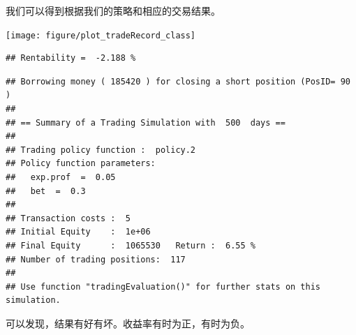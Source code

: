 \documentclass{article}\usepackage[]{graphicx}\usepackage[]{color}
\makeatletter
\newenvironment{kframe}{%
 \def\at@end@of@kframe{}%
 \ifinner\ifhmode%
  \def\at@end@of@kframe{\end{minipage}}%
  \begin{minipage}{\columnwidth}%
 \fi\fi%
 \def\FrameCommand##1{\hskip\@totalleftmargin \hskip-\fboxsep
 \colorbox{shadecolor}{##1}\hskip-\fboxsep
     \hskip-\linewidth \hskip-\@totalleftmargin \hskip\columnwidth}%
 \MakeFramed {\advance\hsize-\width
   \@totalleftmargin\z@ \linewidth\hsize
   \@setminipage}}%
 {\par\unskip\endMakeFramed%
 \at@end@of@kframe}
\newenvironment{knitrout}{}{} %
\makeatother
\begin{document}
\begin{CJK*}{UTF8}{gkai}
我们可以得到根据我们的策略和相应的交易结果。
\begin{knitrout}
\color{fgcolor}

{\centering \texttt{[image: figure/plot\_tradeRecord\_class]} 

}


\begin{kframe}\begin{verbatim}
## Rentability =  -2.188 %
\end{verbatim}
\end{kframe}
\end{knitrout}
\begin{knitrout}
\color{fgcolor}\begin{kframe}
\begin{verbatim}
## Borrowing money ( 185420 ) for closing a short position (PosID= 90 )
## 
## == Summary of a Trading Simulation with  500  days ==
## 
## Trading policy function :  policy.2 
## Policy function parameters:
## 	 exp.prof  =  0.05 
## 	 bet  =  0.3 
## 
## Transaction costs :  5 
## Initial Equity    :  1e+06 
## Final Equity      :  1065530   Return :  6.55 %
## Number of trading positions:  117 
## 
## Use function "tradingEvaluation()" for further stats on this simulation.
\end{verbatim}
\end{kframe}
\end{knitrout}

可以发现，结果有好有坏。收益率有时为正，有时为负。

\end{CJK*}
\end{document}
